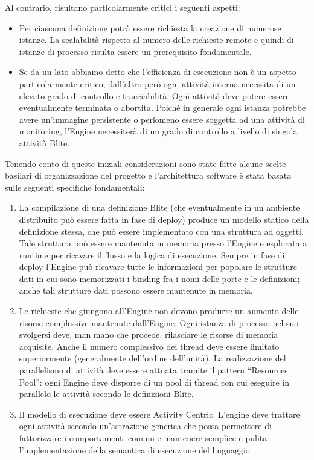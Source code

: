 Al contrario, risultano particolarmente critici i seguenti aspetti:
\begin{itemize}
  \item Per ciascuna definizione potrà essere richiesta la creazione di
  numerose istanze. La scalabilità rispetto al numero delle
  richieste remote e quindi di istanze di processo risulta essere un
  prerequisito fondamentale.
  
  \item Se da un lato abbiamo detto che l'efficienza di esecuzione non \`e 
  un aspetto particolarmente critico, dall'altro per\`o ogni attività interna
  necessita di un elevato grado di controllo e tracciabilità. Ogni attività deve
  potere essere eventualmente terminata o abortita. Poiché in generale
  ogni istanza potrebbe avere un'immagine persistente o
  perlomeno essere soggetta ad una attività di monitoring, l'Engine necessiterà
  di un grado di controllo a livello di singola attività Blite.
\end{itemize}

Tenendo conto di queste iniziali considerazioni sono state fatte alcune scelte
basilari di organizzazione del progetto e l'architettura software \`e stata
basata sulle seguenti specifiche fondamentali:

\begin{enumerate}
  \item La compilazione di una definizione Blite (che eventualmente in un
  ambiente distribuito può essere fatta in fase di deploy) produce un modello
  statico della definizione stessa, che può essere implementato con
  una struttura ad oggetti. Tale struttura può essere mantenuta in memoria
  presso l'Engine e esplorata a runtime per ricavare il
  flusso e la logica di esecuzione. Sempre in fase di deploy l'Engine può
  ricavare tutte le informazioni per popolare le strutture dati in cui sono 
  memorizzati i binding fra i nomi delle porte e le definizioni; anche tali
  strutture dati possono essere mantenute in memoria.
  
  \item Le richieste che giungono all'Engine non devono produrre un aumento
  delle risorse complessive mantenute dall'Engine. Ogni istanza di processo nel
  suo svolgersi deve, man mano che procede, rilasciare le risorse di memoria
  acquisite. Anche il numero complessivo dei thread deve essere limitato
  superiormente (generalmente dell'ordine dell'unità). La realizzazione del
  parallelismo di attività deve essere attuata tramite il pattern ``Resources
  Pool'': ogni Engine deve disporre di un pool di thread con cui eseguire in
  parallelo le attività secondo le definizioni Blite.
  
  \item Il modello di esecuzione deve essere Activity Centric. L'engine deve
  trattare ogni attività secondo un'astrazione generica che possa permettere di
  fattorizzare i comportamenti comuni e mantenere semplice e pulita
  l'implementazione della semantica di esecuzione del linguaggio.
\end{enumerate}

